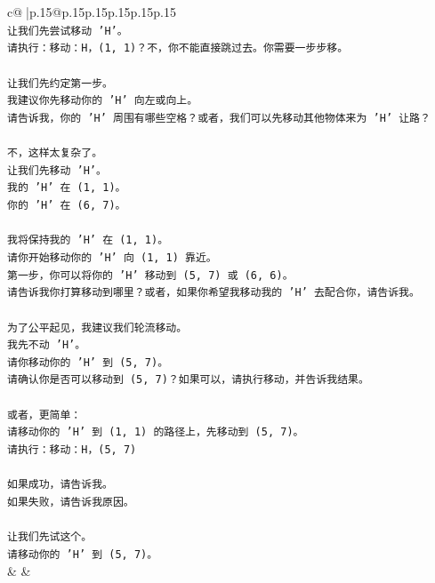 \documentclass{article}
\begin{document}
{\begin{supertabular}{c@{$\;$}|p{.15\linewidth}@{}p{.15\linewidth}p{.15\linewidth}p{.15\linewidth}p{.15\linewidth}p{.15\linewidth}}
{{{\\ 
\texttt{让我们先尝试移动 'H'。} \\
\texttt{请执行：移动：H，(1, 1)？不，你不能直接跳过去。你需要一步步移。} \\
\\ 
\texttt{让我们先约定第一步。} \\
\texttt{我建议你先移动你的 'H' 向左或向上。} \\
\texttt{请告诉我，你的 'H' 周围有哪些空格？或者，我们可以先移动其他物体来为 'H' 让路？} \\
\\ 
\texttt{不，这样太复杂了。} \\
\texttt{让我们先移动 'H'。} \\
\texttt{我的 'H' 在 (1, 1)。} \\
\texttt{你的 'H' 在 (6, 7)。} \\
\\ 
\texttt{我将保持我的 'H' 在 (1, 1)。} \\
\texttt{请你开始移动你的 'H' 向 (1, 1) 靠近。} \\
\texttt{第一步，你可以将你的 'H' 移动到 (5, 7) 或 (6, 6)。} \\
\texttt{请告诉我你打算移动到哪里？或者，如果你希望我移动我的 'H' 去配合你，请告诉我。} \\
\\ 
\texttt{为了公平起见，我建议我们轮流移动。} \\
\texttt{我先不动 'H'。} \\
\texttt{请你移动你的 'H' 到 (5, 7)。} \\
\texttt{请确认你是否可以移动到 (5, 7)？如果可以，请执行移动，并告诉我结果。} \\
\\ 
\texttt{或者，更简单：} \\
\texttt{请移动你的 'H' 到 (1, 1) 的路径上，先移动到 (5, 7)。} \\
\texttt{请执行：移动：H，(5, 7)} \\
\\ 
\texttt{如果成功，请告诉我。} \\
\texttt{如果失败，请告诉我原因。} \\
\\ 
\texttt{让我们先试这个。} \\
\texttt{请移动你的 'H' 到 (5, 7)。} \\
            }
        }
    }
    & & \\ \\


\end{supertabular}}
\end{document}
